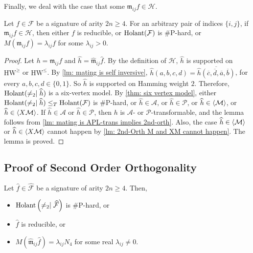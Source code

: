 Finally, we deal with the case that some $\mathfrak{m}_{ij}f\in \mathscr{H}.$

\begin{lemma}\label{lm: 2nd-orth H type}
    Let $f\in \mathcal{F}$ be a signature of arity $2n\ge 4$.
    For an arbitrary pair of indices $\{i,j\}$, if $\mathfrak{m}_{ij}f\in \mathscr{H}$, then either $f$ is reducible, or $\operatorname{Holant}(\mathcal{F})$ is \#P-hard, or $M(\mathfrak{m}_{ij}f)=\lambda_{ij}f$ for some $\lambda_{ij}>0.$
\end{lemma}
\begin{proof}
    Let $h=\mathfrak{m}_{ij}f$ and $\widehat{h}=\widehat{\mathfrak{m}}_{ij}\widehat{f}.$
    By the definition of $\mathscr{H}$, $\widehat{h}$ is supported on $\mathrm{HW}^{\ge}$ or $\mathrm{HW}^{\le}$.
    By \cref{lm: mating is self inversive}, $\widehat{h}(a,b,c,d)=\overline{\widehat{h}(\overline{c},\overline{d},\overline{a},\overline{b})}$, for every $a,b,c,d\in \{0,1\}.$
    So $\widehat{h}$ is supported on Hamming weight $2.$
    Therefore, $\operatorname{Holant}(\neq_2\mid \widehat{h})$ is a six-vertex model.
    By \cref{thm: six vertex model}, either
    $\operatorname{Holant}(\neq_2\mid \widehat{h})\le_T\operatorname{Holant}(\mathcal{F})$ is \#P-hard, or $\widehat{h}\in \mathscr{A}$, or $\widehat{h}\in \mathscr{P}$, or $\widehat{h}\in \braket{\mathcal{M}}$, or $\widehat{h}\in \braket{X\mathcal{M}}$.
    If $\widehat{h}\in \mathscr{A}$ or $\widehat{h}\in \mathscr{P}$,
    then $h$ is $\mathscr{A}$- or $\mathscr{P}$-transformable, and the lemma follows from \cref{lm: mating is APL-trans implies 2nd-orth}.
    Also, the case $\widehat{h}\in \braket{\mathcal{M}}$ or $\widehat{h}\in \braket{X\mathcal{M}}$ cannot happen by \cref{lm: 2nd-Orth M and XM cannot happen}.
    The lemma is proved.
\end{proof}

\subsection{Proof of Second Order Orthogonality}

\iffalse
\begin{lemma}\label{lm: pre not 2nd-orth is hard}
    Let $\widehat f\in\widehat{\mathcal{F}}$ be a signature of arity $2n\geqslant 4$. 
    Then, 
    \begin{itemize}

        \item $\operatorname{Holant}\left(\neq_2\mid \widehat{\mathcal{F}}\right)$ is \#P-hard, or

        \item $\widehat{f}$ is reducible, or
        \item  $M(\widehat{\mathfrak{m}}_{ij}\widehat{f})= \lambda_{ij} N_4$ for some real $\lambda_{ij}\neq 0$.
    \end{itemize}
\end{lemma}

